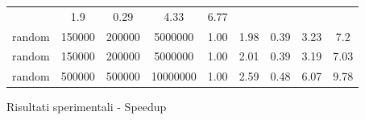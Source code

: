 \begin{figure*}[t]
{\begin{tabular}{lS[table-format=7.0] S[table-format=7.0] S[table-format=8.0] S[table-format=4.2] S[table-format=4.2] S[table-format=4.2] S[table-format=4.2] S[table-format=4.2]}
        & 1.9	
        & 0.29	
        & 4.33	
        & 6.77 \\
    random
        & 150000	
        & 200000	
        & 5000000	
        & 1.00	
        & 1.98	
        & 0.39	
        & 3.23	
        & 7.2 \\
    random
        & 150000	
        & 200000	
        & 5000000	
        & 1.00	
        & 2.01	
        & 0.39	
        & 3.19	
        & 7.03 \\
    random
        & 500000	
        & 500000	
        & 10000000	
        & 1.00	
        & 2.59	
        & 0.48	
        & 6.07	
        & 9.78 \\ \bottomrule
    \end{tabular}}
    \caption{Risultati sperimentali -  Speedup}
    \label{results}
\end{figure*}



